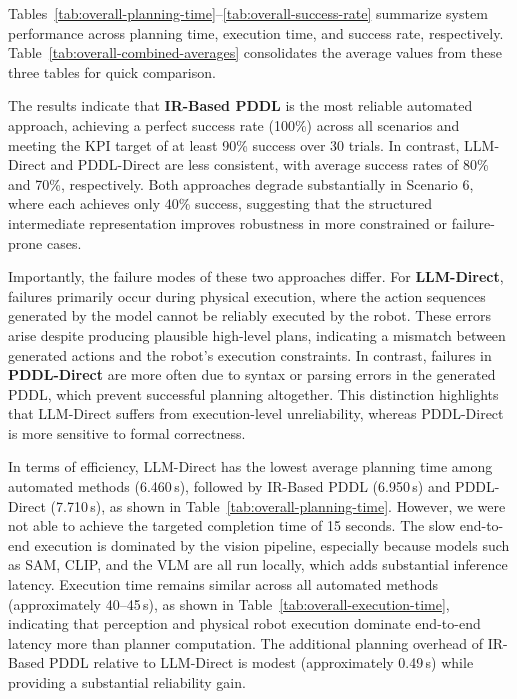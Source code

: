 \documentclass[12pt]{extarticle}
\begin{document}
Tables~\ref{tab:overall-planning-time}--\ref{tab:overall-success-rate} summarize system performance across planning time, execution time, and success rate, respectively. Table~\ref{tab:overall-combined-averages} consolidates the average values from these three tables for quick comparison.

The results indicate that \textbf{IR-Based PDDL} is the most reliable automated approach, achieving a perfect success rate (100\%) across all scenarios and meeting the KPI target of at least 90\% success over 30 trials. In contrast, LLM-Direct and PDDL-Direct are less consistent, with average success rates of 80\% and 70\%, respectively. Both approaches degrade substantially in Scenario 6, where each achieves only 40\% success, suggesting that the structured intermediate representation improves robustness in more constrained or failure-prone cases.

Importantly, the failure modes of these two approaches differ. For \textbf{LLM-Direct}, failures primarily occur during physical execution, where the action sequences generated by the model cannot be reliably executed by the robot. These errors arise despite producing plausible high-level plans, indicating a mismatch between generated actions and the robot's execution constraints. In contrast, failures in \textbf{PDDL-Direct} are more often due to syntax or parsing errors in the generated PDDL, which prevent successful planning altogether. This distinction highlights that LLM-Direct suffers from execution-level unreliability, whereas PDDL-Direct is more sensitive to formal correctness.

In terms of efficiency, LLM-Direct has the lowest average planning time among automated methods (6.460\,s), followed by IR-Based PDDL (6.950\,s) and PDDL-Direct (7.710\,s), as shown in Table~\ref{tab:overall-planning-time}. However, we were not able to achieve the targeted completion time of 15 seconds. The slow end-to-end execution is dominated by the vision pipeline, especially because models such as SAM, CLIP, and the VLM are all run locally, which adds substantial inference latency. Execution time remains similar across all automated methods (approximately 40--45\,s), as shown in Table~\ref{tab:overall-execution-time}, indicating that perception and physical robot execution dominate end-to-end latency more than planner computation. The additional planning overhead of IR-Based PDDL relative to LLM-Direct is modest (approximately 0.49\,s) while providing a substantial reliability gain.
\end{document}
